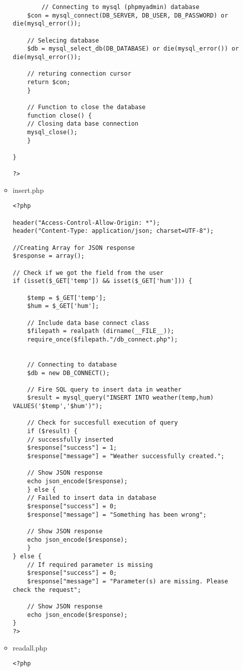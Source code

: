 \documentclass[a4paper,oneside]{article}
\begin{document}
\begin{enumerate}
\begin{itemize}
\begin{verbatim}
		// Connecting to mysql (phpmyadmin) database
	$con = mysql_connect(DB_SERVER, DB_USER, DB_PASSWORD) or die(mysql_error());

	// Selecing database
	$db = mysql_select_db(DB_DATABASE) or die(mysql_error()) or die(mysql_error());

	// returing connection cursor
	return $con;
    }

	// Function to close the database
    function close() {
	// Closing data base connection
	mysql_close();
    }

}

?>
\end{verbatim}
\item insert.php
\label{sec:orgef94d73}
\begin{verbatim}
<?php

header("Access-Control-Allow-Origin: *");
header("Content-Type: application/json; charset=UTF-8");

//Creating Array for JSON response
$response = array();

// Check if we got the field from the user
if (isset($_GET['temp']) && isset($_GET['hum'])) {

    $temp = $_GET['temp'];
    $hum = $_GET['hum'];

    // Include data base connect class
    $filepath = realpath (dirname(__FILE__));
	require_once($filepath."/db_connect.php");


    // Connecting to database 
    $db = new DB_CONNECT();

    // Fire SQL query to insert data in weather
    $result = mysql_query("INSERT INTO weather(temp,hum) VALUES('$temp','$hum')");

    // Check for succesfull execution of query
    if ($result) {
	// successfully inserted 
	$response["success"] = 1;
	$response["message"] = "Weather successfully created.";

	// Show JSON response
	echo json_encode($response);
    } else {
	// Failed to insert data in database
	$response["success"] = 0;
	$response["message"] = "Something has been wrong";

	// Show JSON response
	echo json_encode($response);
    }
} else {
    // If required parameter is missing
    $response["success"] = 0;
    $response["message"] = "Parameter(s) are missing. Please check the request";

    // Show JSON response
    echo json_encode($response);
}
?>
\end{verbatim}
\item readall.php
\label{sec:org33845a3}
\begin{verbatim}
<?php


\end{verbatim}
\end{itemize}
\end{enumerate}
\end{document}
